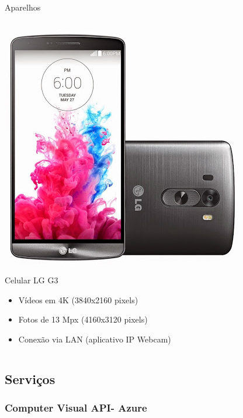 \documentclass{beamer}
\begin{document}
\begin{frame}{Aparelhos}
\begin{columns}
\begin{column}{0.5\textwidth}
\begin{center}
\includegraphics[width=.56\textwidth]{img/slide_cam2.jpg}   
\end{center}
Celular LG G3
\begin{itemize}\tiny
 \item Vídeos em 4K (3840x2160 pixels)  
 \item Fotos de 13 Mpx (4160x3120 pixels) 
 \item Conexão via LAN (aplicativo IP Webcam)
\end{itemize}
\end{column}
\end{columns}
\end{frame}

\subsection{Serviços}
\subsubsection{Computer Visual API- Azure}
\end{document}
